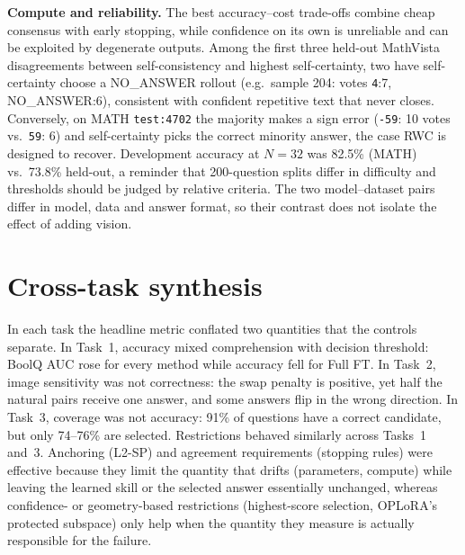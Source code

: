 \documentclass{article}
\begin{document}
\textbf{Compute and reliability.} The best accuracy--cost trade-offs combine cheap consensus with early stopping, while confidence on its own is unreliable and can be exploited by degenerate outputs. Among the first three held-out MathVista disagreements between self-consistency and highest self-certainty, two have self-certainty choose a NO\_ANSWER rollout (e.g.\ sample 204: votes \texttt{4}:7, NO\_ANSWER:6), consistent with confident repetitive text that never closes. Conversely, on MATH \texttt{test:4702} the majority makes a sign error (\texttt{-59}: 10 votes vs.\ \texttt{59}: 6) and self-certainty picks the correct minority answer, the case RWC is designed to recover. Development accuracy at $N{=}32$ was 82.5\% (MATH) vs.\ 73.8\% held-out, a reminder that 200-question splits differ in difficulty and thresholds should be judged by relative criteria. The two model--dataset pairs differ in model, data and answer format, so their contrast does not isolate the effect of adding vision.

\section{Cross-task synthesis}
In each task the headline metric conflated two quantities that the controls separate. In Task~1, accuracy mixed comprehension with decision threshold: BoolQ AUC rose for every method while accuracy fell for Full FT. In Task~2, image sensitivity was not correctness: the swap penalty is positive, yet half the natural pairs receive one answer, and some answers flip in the wrong direction. In Task~3, coverage was not accuracy: 91\% of questions have a correct candidate, but only 74--76\% are selected. Restrictions behaved similarly across Tasks~1 and~3. Anchoring (L2-SP) and agreement requirements (stopping rules) were effective because they limit the quantity that drifts (parameters, compute) while leaving the learned skill or the selected answer essentially unchanged, whereas confidence- or geometry-based restrictions (highest-score selection, OPLoRA's protected subspace) only help when the quantity they measure is actually responsible for the failure.
\end{document}

